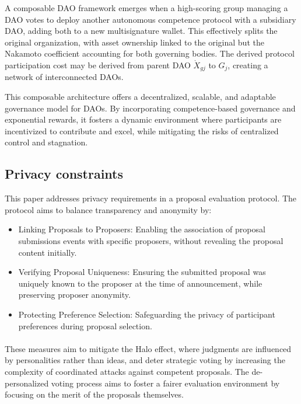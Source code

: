 \documentclass{article}
\begin{document}
\begin{CJK}{UTF8}{gbsn}
\begin{multicols}{2}
        A composable DAO framework emerges when a high-scoring group managing a DAO votes to deploy another autonomous competence protocol with a subsidiary DAO, adding both to a new multisignature wallet. This effectively splits the original organization, with asset ownership linked to the original but the Nakamoto coefficient accounting for both governing bodies. The derived protocol participation cost may be derived from parent DAO  $ \grave{X}_{gj}$ to $G_j$, creating a network of interconnected DAOs.

        This composable architecture offers a decentralized, scalable, and adaptable governance model for DAOs. By incorporating competence-based governance and exponential rewards, it fosters a dynamic environment where participants are incentivized to contribute and excel, while mitigating the risks of centralized control and stagnation.


        \subsection{Privacy constraints}

        This paper addresses privacy requirements in a proposal evaluation protocol. The protocol aims to balance transparency and anonymity by:
        \begin{itemize}
            \item Linking Proposals to Proposers: Enabling the association of proposal submissions events with specific proposers, without revealing the proposal content initially.
            \item Verifying Proposal Uniqueness: Ensuring the submitted proposal was uniquely known to the proposer at the time of announcement, while preserving proposer anonymity.
            \item Protecting Preference Selection: Safeguarding the privacy of participant preferences during proposal selection.

        \end{itemize}
        \paragraph{}

        These measures aim to mitigate the Halo effect, where judgments are influenced by personalities rather than ideas, and deter strategic voting by increasing the complexity of coordinated attacks against competent proposals. The de-personalized voting process aims to foster a fairer evaluation environment by focusing on the merit of the proposals themselves.


\end{multicols}
\end{CJK}
\end{document}
